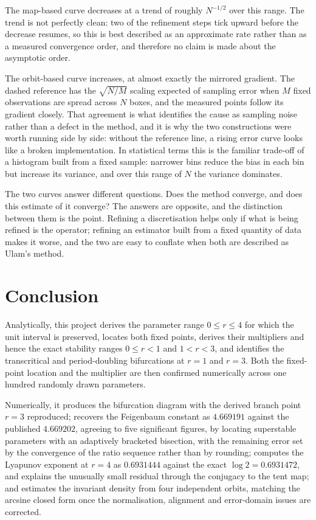 \documentclass[11pt,a4paper]{article}
\theoremstyle{definition}
\theoremstyle{remark}
\begin{document}
The map-based curve decreases at a trend of roughly $N^{-1/2}$ over this
range. The trend is not perfectly clean: two of the refinement steps tick
upward before the decrease resumes, so this is best described as an
approximate rate rather than as a measured convergence order, and therefore
no claim is made about the asymptotic order.

The orbit-based curve increases, at almost exactly the mirrored gradient. The
dashed reference has the $\sqrt{N/M}$ scaling expected of sampling error when
$M$ fixed observations are spread across $N$ boxes, and the measured points
follow its gradient closely. That agreement is what identifies the cause as
sampling noise rather than a defect in the method, and it is why the two
constructions were worth running side by side: without the reference line, a
rising error curve looks like a broken implementation. In statistical terms
this is the familiar trade-off of a histogram built from a fixed sample:
narrower bins reduce the bias in each bin but increase its variance, and over
this range of $N$ the variance dominates.

The two curves answer different questions. Does the method converge, and does
this estimate of it converge? The answers are opposite, and the distinction
between them is the point. Refining a discretisation helps only if what is
being refined is the operator; refining an estimator built from a fixed
quantity of data makes it worse, and the two are easy to conflate when both
are described as Ulam's method.

\section{Conclusion}

Analytically, this project derives the parameter range $0\le r\le4$ for which
the unit interval is preserved, locates both fixed points, derives their
multipliers and hence the exact stability ranges $0\le r<1$ and $1<r<3$, and
identifies the transcritical and period-doubling bifurcations at $r=1$ and
$r=3$. Both the fixed-point location and the multiplier are then confirmed
numerically across one hundred randomly drawn parameters.

Numerically, it produces the bifurcation diagram with the derived branch point
$r=3$ reproduced; recovers the Feigenbaum constant as $4.669191$ against the
published $4.669202$, agreeing to five significant figures, by locating
superstable parameters with an adaptively bracketed bisection, with the
remaining error set by the convergence of the ratio sequence rather than by
rounding; computes the Lyapunov exponent at $r=4$ as $0.6931444$ against the
exact $\log2 = 0.6931472$, and explains the unusually small residual through
the conjugacy to the tent map; and estimates the invariant density from four independent
orbits, matching the arcsine closed form once the normalisation, alignment and
error-domain issues are corrected.
\end{document}

